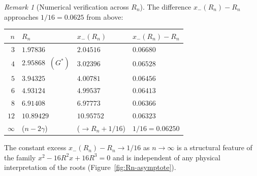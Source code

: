 \documentclass[11pt]{article}
\theoremstyle{definition}
\theoremstyle{remark}
\newtheorem*{remark}{Remark}
\newcommand{\Gs}{G^{*}}
\begin{document}
\begin{remark}[Numerical verification across $R_n$]\label{rem:asym-numerics}
The difference $x_-(R_n) - R_n$ approaches $1/16 = 0.0625$ from above:
\begin{center}
\begin{tabular}{rlll}
\toprule
$n$ & $R_n$ & $x_-(R_n)$ & $x_-(R_n) - R_n$ \\
\midrule
$3$ & $1.97836$ & $2.04516$ & $0.06680$ \\
$4$ & $2.95868\;\;(\Gs)$ & $3.02396$ & $0.06528$ \\
$5$ & $3.94325$ & $4.00781$ & $0.06456$ \\
$6$ & $4.93124$ & $4.99537$ & $0.06413$ \\
$8$ & $6.91408$ & $6.97773$ & $0.06366$ \\
$12$ & $10.89429$ & $10.95752$ & $0.06323$ \\
$\infty$ & ($n - 2\gamma$) & ($\to R_n + 1/16$) & $1/16 = 0.06250$ \\
\bottomrule
\end{tabular}
\end{center}
The constant excess $x_-(R_n) - R_n \to 1/16$ as $n \to \infty$ is a
structural feature of the family $x^2 - 16 R^2 x + 16 R^3 = 0$ and is
independent of any physical interpretation of the roots
(Figure~\ref{fig:Rn-asymptote}).


\end{remark}
\end{document}

